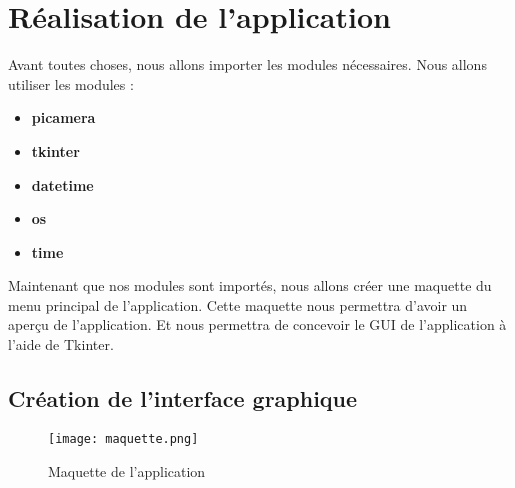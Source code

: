     
    \section{Réalisation de l'application}
        Avant toutes choses, nous allons importer les modules nécessaires.
        Nous allons utiliser les modules :
        \begin{itemize}
            \item \textbf{picamera}
            \item \textbf{tkinter}
            \item \textbf{datetime}
            \item \textbf{os}
            \item \textbf{time}
        \end{itemize}

        \begin{flushleft}
            Maintenant que nos modules sont importés, nous allons créer une maquette du menu principal de l'application.
            Cette maquette nous permettra d'avoir un aperçu de l'application.
            Et nous permettra de concevoir le GUI de l'application à l'aide de Tkinter.            
        \end{flushleft}

        \subsection{Création de l'interface graphique}
            \begin{figure}[h]
                \centering
                \texttt{[image: maquette.png]} 
                \caption{Maquette de l'application}
            \end{figure}

